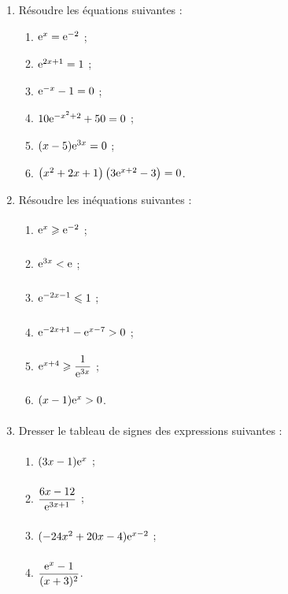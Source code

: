 \documentclass[a4paper,11pt]{article}
\begin{document}
\begin{enumerate}
	\item Résoudre les équations suivantes :
	\begin{multicols}{3}
		\newcommand\espv{\left(x^2+2x+1\right)\left( 3\e^{x+2}-3 \right)}
		\begin{enumerate}
			\item $\e^{x}=\e^{-2}\vphantom{\espv}$ ;
			\item $\e^{2x+1}=1\vphantom{\espv}$ ;
			\item $\e^{-x}-1=0\vphantom{\espv}$ ;
			\item $10\e^{-x^2+2}+50=0\vphantom{\espv}$ ;
			\item $(x-5)\e^{3x}=0\vphantom{\espv}$ ;
			\item $\left(x^2+2x+1\right)\left( 3{\rm e}^{x+2}-3 \right)=0$.
		\end{enumerate}
	\end{multicols}
	\item Résoudre les inéquations suivantes :
	\begin{multicols}{3}
		\newcommand\espv{\e^{x+4} \pg \dfrac{1}{\e^{3x}}}
		\begin{enumerate}
			\item $\e^{x} \pg \e^{-2}\vphantom{\espv}$ ;
			\item $\e^{3x} < \e\vphantom{\espv}$ ;
			\item $\e^{-2x-1} \pp 1\vphantom{\espv}$ ;
			\item $\e^{-2x+1} -\e^{x-7} > 0\vphantom{\espv}$ ;
			\item ${\rm e}^{x+4} \geqslant \dfrac{1}{{\rm e}^{3x}}$ ;
			\item $(x-1)\e^x  > 0\vphantom{\espv}$.
		\end{enumerate}
	\end{multicols}
	\item Dresser le tableau de signes des expressions suivantes :
	\begin{multicols}{2}
		\newcommand\espv{\dfrac{\e^x-1}{(x+3)^2}}
		\begin{enumerate}
			\item $(3x-1)\e^x\vphantom{\espv}$ ;
			\item $\dfrac{6x-12}{\e^{3x+1}}\vphantom{\espv}$ ;
			\item $(-24x^2+20x-4)\e^{x-2}\vphantom{\espv}$ ;
			\item $\dfrac{{\rm e}^x-1}{(x+3)^2}$.
		\end{enumerate}
	\end{multicols}
\end{enumerate}
\end{document}

